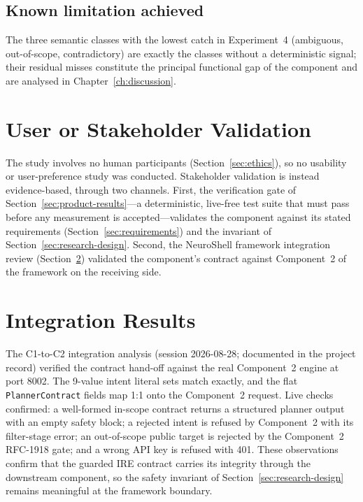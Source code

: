 \subsection{Known limitation achieved}

The three semantic classes with the lowest catch in Experiment~4 (ambiguous,
out-of-scope, contradictory) are exactly the classes without a deterministic
signal; their residual misses constitute the principal functional gap of the
component and are analysed in Chapter~\ref{ch:discussion}.

\section{User or Stakeholder Validation}\label{sec:stakeholder-validation}

The study involves no human participants (Section~\ref{sec:ethics}), so no
usability or user-preference study was conducted. Stakeholder validation is
instead evidence-based, through two channels. First, the verification gate of
Section~\ref{sec:product-results}---a deterministic, live-free test suite that
must pass before any measurement is accepted---validates the component against
its stated requirements (Section~\ref{sec:requirements}) and the invariant of
Section~\ref{sec:research-design}. Second, the NeuroShell framework integration
review (Section~\ref{sec:integration-results}) validated the component's
contract against Component~2 of the framework on the receiving side.

\section{Integration Results}\label{sec:integration-results}

The C1-to-C2 integration analysis (session 2026-08-28; documented in the
project record) verified the contract hand-off against the real Component~2
engine at port 8002. The 9-value intent literal sets match exactly, and the
flat \texttt{PlannerContract} fields map 1:1 onto the Component~2 request. Live
checks confirmed: a well-formed in-scope contract returns a structured
planner output with an empty safety block; a rejected intent is refused by
Component~2 with its filter-stage error; an out-of-scope public target is
rejected by the Component~2 RFC-1918 gate; and a wrong API key is refused with
401. These observations confirm that the guarded IRE contract carries its
integrity through the downstream component, so the safety invariant of
Section~\ref{sec:research-design} remains meaningful at the framework boundary.

